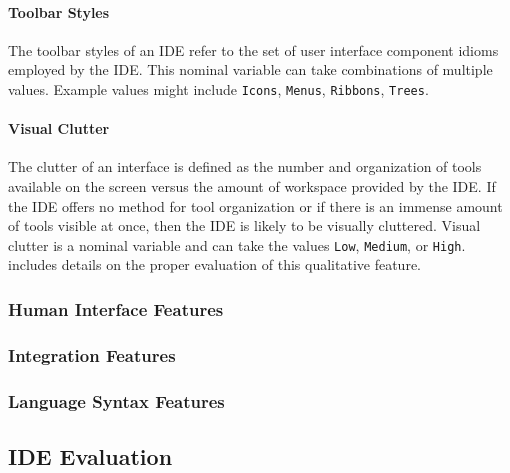 \paragraph{Toolbar Styles} The toolbar styles of an IDE refer to the set of
user interface component idioms employed by the IDE. \cite{galitz2007} This
nominal variable can take combinations of multiple values. Example values
might include \texttt{Icons}, \texttt{Menus}, \texttt{Ribbons},
\texttt{Trees}.


\paragraph{Visual Clutter} The clutter of an interface is defined as the
number and organization of tools available on the screen versus the amount
of workspace provided by the IDE. If the IDE offers no method for tool
organization or if there is an immense amount of tools visible at once,
then the IDE is likely to be visually cluttered. Visual clutter is a
nominal variable and can take the values \texttt{Low}, \texttt{Medium}, or
\texttt{High}.  includes details on the proper
evaluation of this qualitative feature.

\subsubsection{Human Interface Features} \label{subsubsec:humaninterface}
\subsubsection{Integration Features} \label{subsubsec:integration}
\subsubsection{Language Syntax Features} \label{subsubsec:languagesyntax}


\subsection{IDE Evaluation} \label{subsec:ideevaluation}
